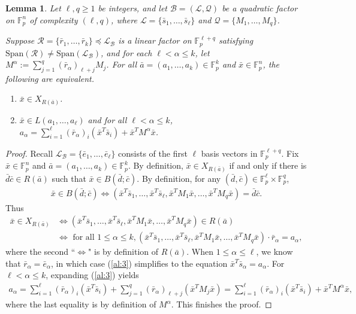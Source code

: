 \documentclass[12pt,oneside,british,a4wide]{amsart}
\newtheorem{lemma}[theorem]{Lemma}
\numberwithin{equation}{section}
\theoremstyle{definition}
\def\F{\mathbb{F}}
\newcommand{\abar}{\bar{a}}
\newcommand{\cbar}{\bar{c}}
\newcommand{\dbar}{\bar{d}}
\newcommand{\ebar}{\bar{e}}
\newcommand{\rbar}{\bar{r}}
\newcommand{\sbar}{\bar{s}}
\newcommand{\xbar}{\bar{x}}
\newcommand{\calL}{\mathcal{L}}
\newcommand{\calB}{\mathcal{B}}
\newcommand{\calQ}{\mathcal{Q}}
\newcommand{\calR}{\mathcal{R}}
\newcommand{\Span}{{\mathrm{Span}}}
\begin{document}
\begin{lemma}\label{lem:pullback2}
Let $\ell,q\geq 1$ be integers, and let $\calB=(\calL,\calQ)$ be a quadratic factor on $\F_p^n$ of complexity $(\ell,q)$, where $\calL=\{\sbar_1,\ldots, \sbar_{\ell}\}$ and $\calQ=\{M_1,\ldots, M_q\}$.  

Suppose $\calR=\{\rbar_1,\ldots, \rbar_k\}\preceq\calL_{\calB}$ is a linear factor on $\F_p^{\ell+q}$ satisfying $\Span(\calR)\neq \Span(\calL_{\calB})$, and for each $\ell<\alpha\leq k$, let $M^{\alpha}:=\sum_{j=1}^q(\rbar_{\alpha})_{\ell+j}M_j$. For all $\abar=(a_1,\ldots, a_k)\in \F_p^k$ and  $\xbar\in \F_p^{n}$, the following are equivalent.
\begin{enumerate}
\item $\xbar\in X_{R(\abar)}$. 
\item $\xbar\in L(a_1,\ldots, a_{\ell})$ and for all $\ell < \alpha\leq k$, $a_{\alpha}=\sum_{i=1}^{\ell}(\rbar_{\alpha})_i(\xbar^T\sbar_i)+\xbar^TM^{\alpha}\xbar$. 
\end{enumerate}
\end{lemma}
\begin{proof}
Recall $\calL_{\calB}=\{\ebar_1,\ldots, \ebar_{\ell}\}$ consists of the first $\ell$ basis vectors in $\F_p^{\ell+q}$.  Fix $\xbar\in \F_p^n$ and $\abar=(a_1,\ldots, a_{k})\in \mathbb{F}_p^k$.  By definition, $\xbar\in X_{R(\abar)}$ if and only if there is $\dbar\cbar\in R(\abar)$ such that $\xbar\in B(\dbar;\cbar)$.  By definition, for any $(\dbar,\cbar)\in \F_p^{\ell}\times \F_p^q$,
\begin{align*}
\xbar\in B(\dbar;\cbar)\Leftrightarrow(\xbar^T \sbar_1,\ldots, \xbar^T\sbar_{\ell},\xbar^TM_1\xbar, \ldots, \xbar^TM_q\xbar)=\dbar\cbar.
\end{align*}
Thus  
\begin{align}\label{al:3}
\xbar\in X_{R(\abar)}&\Leftrightarrow (\xbar^T \sbar_1,\ldots, \xbar^T\sbar_{\ell},\xbar^TM_1\xbar, \ldots, \xbar^TM_q\xbar)\in R(\abar)\nonumber \\
&\Leftrightarrow \text{  for all $1\leq \alpha\leq k$}, (\xbar^T \sbar_1,\ldots, \xbar^T\sbar_{\ell},\xbar^TM_1\xbar, \ldots, \xbar^TM_q\xbar) \cdot \rbar_\alpha=a_\alpha,
\end{align}
where the second ``$\Leftrightarrow$" is by definition of $R(\abar)$.    When $1\leq \alpha\leq \ell$, we know that $\rbar_{\alpha}=\ebar_{\alpha}$, in which case  (\ref{al:3}) simplifies to the equation $\xbar^T\sbar_{\alpha}=a_{\alpha}$.  For $\ell<\alpha\leq k$, expanding (\ref{al:3}) yields 
\begin{align}\label{al:4}
a_\alpha=\sum_{i=1}^{\ell} (\rbar_\alpha)_i (\xbar^T\sbar_i) + \sum_{j=1}^q (\rbar_\alpha)_{\ell+j}(\xbar^TM_j\xbar)=\sum_{i=1}^{\ell} (\rbar_\alpha)_i (\xbar^T \sbar_i) +\xbar^TM^\alpha \xbar,
\end{align}
where the last equality is by definition of $M^{\alpha}$.  This finishes the proof.
\end{proof}
\end{document}
